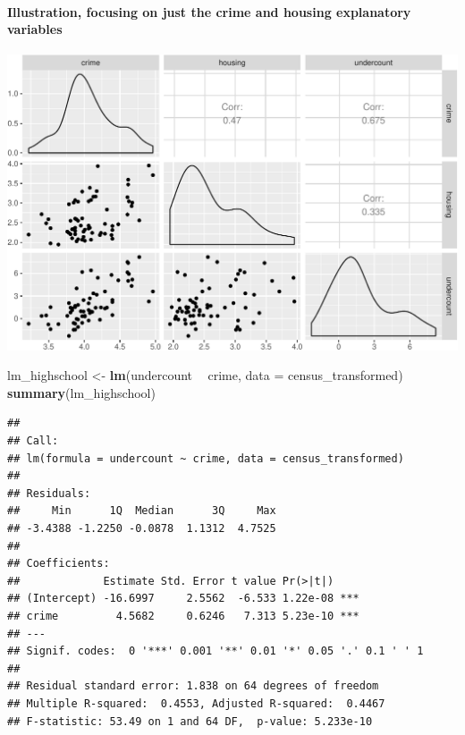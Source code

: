 \documentclass[landscape]{article}
\newenvironment{Shaded}{\begin{snugshade}}{\end{snugshade}}
\newcommand{\KeywordTok}[1]{\textcolor[rgb]{0.13,0.29,0.53}{\textbf{#1}}}
\newcommand{\DataTypeTok}[1]{\textcolor[rgb]{0.13,0.29,0.53}{#1}}
\newcommand{\StringTok}[1]{\textcolor[rgb]{0.31,0.60,0.02}{#1}}
\newcommand{\OperatorTok}[1]{\textcolor[rgb]{0.81,0.36,0.00}{\textbf{#1}}}
\newcommand{\NormalTok}[1]{#1}
\let\oldparagraph\paragraph
\renewcommand{\paragraph}[1]{\oldparagraph{#1}\mbox{}}
\begin{document}
\paragraph{Illustration, focusing on just the crime and housing
explanatory
variables}\label{illustration-focusing-on-just-the-crime-and-housing-explanatory-variables}

\begin{Shaded}
\end{Shaded}

\includegraphics{20190422_multicollinearity_files/figure-latex/unnamed-chunk-5-1.pdf}

\newpage

\begin{Shaded}
\begin{Highlighting}[]
\NormalTok{lm_highschool <-}\StringTok{ }\KeywordTok{lm}\NormalTok{(undercount }\OperatorTok{~}\StringTok{ }\NormalTok{crime, }\DataTypeTok{data =}\NormalTok{ census_transformed)}
\KeywordTok{summary}\NormalTok{(lm_highschool)}
\end{Highlighting}
\end{Shaded}

\begin{verbatim}
## 
## Call:
## lm(formula = undercount ~ crime, data = census_transformed)
## 
## Residuals:
##     Min      1Q  Median      3Q     Max 
## -3.4388 -1.2250 -0.0878  1.1312  4.7525 
## 
## Coefficients:
##             Estimate Std. Error t value Pr(>|t|)    
## (Intercept) -16.6997     2.5562  -6.533 1.22e-08 ***
## crime         4.5682     0.6246   7.313 5.23e-10 ***
## ---
## Signif. codes:  0 '***' 0.001 '**' 0.01 '*' 0.05 '.' 0.1 ' ' 1
## 
## Residual standard error: 1.838 on 64 degrees of freedom
## Multiple R-squared:  0.4553, Adjusted R-squared:  0.4467 
## F-statistic: 53.49 on 1 and 64 DF,  p-value: 5.233e-10
\end{verbatim}
\end{document}
